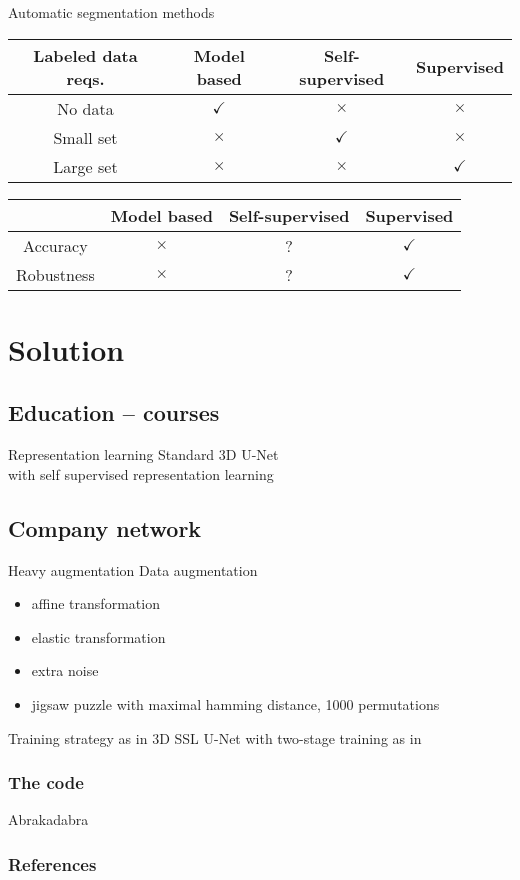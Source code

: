 \documentclass[aspectratio=169]{beamer}
\begin{document}
\begin{frame}{Automatic segmentation methods}
    \begin{center}
        \begin{tabular}{ c || c | c | c}
            Labeled data reqs. & Model based & Self-supervised & Supervised \\
            \hline
            No data & $\checkmark$ & $\times$ & $\times$ \\
            Small set & $\times$ & $\checkmark$ & $\times$ \\
            Large set & $\times$ & $\times$ & $\checkmark$
        \end{tabular}

        \vspace{2em}

        \begin{tabular}{ c || c | c | c}
            & Model based & Self-supervised & Supervised \\
            \hline
            Accuracy & $\times$ & ? & $\checkmark$ \\
            Robustness & $\times$ & ? & $\checkmark$ \\
        \end{tabular}
    \end{center}
\end{frame}

\section{Solution}
\subsection{Education -- courses}
\begin{frame}{Representation learning}
    \centering Standard 3D U-Net \cite{cciccek20163d}\\ with self supervised representation learning
\end{frame}

\subsection{Company network}
\begin{frame}{Heavy augmentation}
    Data augmentation
    \begin{itemize}
        \item affine transformation 
        \item elastic transformation
        \item extra noise
        \item jigsaw puzzle with maximal hamming distance, 1000 permutations
    \end{itemize}
    Training strategy as in 3D SSL U-Net with two-stage training as in \cite{adam2023}
\end{frame}

\backupbegin
\begin{frame}[c]
    \frametitle{The code}
    \centering
    Abrakadabra
\end{frame}

\begin{frame}%
    \frametitle{References}
    
    {
    \tiny
    
    }
\end{frame}
\backupend
\end{document}
